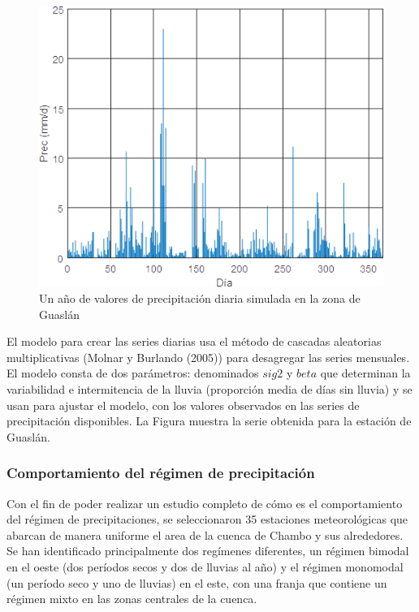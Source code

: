   \begin{figure}[h!]
    \begin{center}
      \includegraphics[height=3.in]{Figures/prec_sint.png}
      \caption{ Un año de valores de precipitación diaria simulada en la zona de Guaslán}
      \label{3}
    \end{center}
  \end{figure}


El modelo para crear las series diarias usa el método de cascadas aleatorias multiplicativas (Molnar y Burlando (2005)) para 
desagregar las series mensuales. El modelo consta de dos parámetros: denominados $sig2$ y $beta$
que determinan la variabilidad e intermitencia de la lluvia (proporción media de días sin lluvia) y se usan para 
ajustar el modelo, con los valores observados en las series de precipitación disponibles.
La Figura  muestra la serie obtenida para la estación de Guaslán.

\subsubsection{Comportamiento del régimen de precipitación}
\label{regimenes_prec}
Con el fin de poder realizar un estudio completo de cómo es el comportamiento del régimen de precipitaciones, 
se seleccionaron 35 estaciones  meteorológicas que abarcan de manera uniforme el area de la cuenca de Chambo y sus alrededores.
Se han identificado principalmente dos regímenes diferentes, un régimen bimodal en el oeste (dos períodos secos y dos de lluvias al año) 
y el régimen monomodal (un período seco y uno de lluvias) en el este, con una franja que contiene un régimen mixto en 
las zonas centrales de la cuenca.






